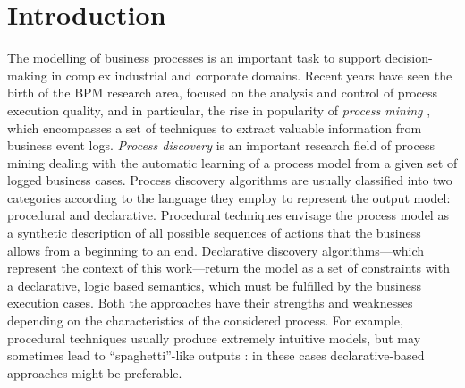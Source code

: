 
\section{Introduction}
\label{sec:intro}
The modelling of business processes is an important task to support decision-making in complex industrial and corporate domains. Recent years have seen the birth of the \ac{BPM} research area, focused on the analysis and control of process execution quality, and in particular, the rise in popularity of \emph{process mining} \cite{2012-Aalst}, which encompasses a set of techniques to extract valuable information from business event logs. 
%
\emph{Process discovery} is an important research field of process mining dealing with the automatic learning of a process model from a given set of logged business cases. 
Process discovery algorithms are usually classified into two categories according to the language they employ to represent the output model: procedural and declarative.
Procedural techniques envisage the process model as a synthetic description of all possible sequences of actions that the business allows from a beginning to an end. Declarative discovery algorithms---which represent the context of this work---return the model as a set of constraints with a declarative, logic based semantics, which must be fulfilled by the business execution cases. 
%
Both the approaches have their strengths and weaknesses depending on the characteristics of the considered process. For example, procedural techniques usually produce extremely intuitive models, but may sometimes lead to ``spaghetti''-like outputs \cite{2009-Fahland, 2018b-Maggi}: in these cases declarative-based approaches might be preferable.

